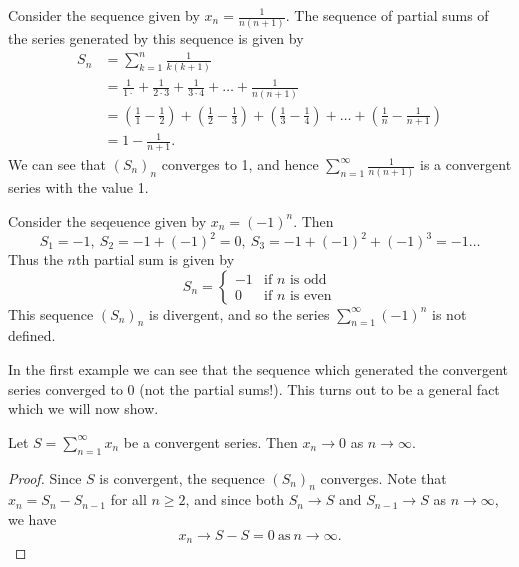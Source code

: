 \documentclass[../real_analysis.tex]{subfiles}
\begin{document}
        \begin{example}
            Consider the sequence given by $x_n=\frac{1}{n(n+1)}$. The sequence of partial sums of the series generated by this sequence is given by
            \begin{align*}
                S_n&=\sum_{k=1}^n\frac{1}{k(k+1)}\\
                &=\frac{1}{1\cdot}+\frac{1}{2\cdot3}+\frac{1}{3\cdot4}+\dots+\frac{1}{n(n+1)}\\
                &=\left(\frac{1}{1}-\frac{1}{2}\right)+\left(\frac{1}{2}-\frac{1}{3}\right)+\left(\frac{1}{3}-\frac{1}{4}\right)+\dots+\left(\frac{1}{n}-\frac{1}{n+1}\right)\\
                &=1-\frac{1}{n+1}.
            \end{align*}
            We can see that $(S_n)_n$ converges to 1, and hence $\sum_{n=1}^\infty\frac{1}{n(n+1)}$ is a convergent series with the value 1.
        \end{example}
        \begin{example}
            Consider the seqeuence given by $x_n=(-1)^n$. Then
            \begin{equation*}
                S_1=-1,\ S_2=-1+(-1)^2=0,\ S_3=-1+(-1)^2+(-1)^3=-1\dots
            \end{equation*}
            Thus the $n$th partial sum is given by
            \begin{equation*}
                S_n=\begin{cases}
                    -1 & \text{if $n$ is odd}\\
                    0 & \text{if $n$ is even}
                \end{cases}
            \end{equation*}
            This sequence $(S_n)_n$ is divergent, and so the series $\sum_{n=1}^\infty(-1)^n$ is not defined.
        \end{example}
        In the first example we can see that the sequence which generated the convergent series converged to 0 (not the partial sums!). This turns out to be a general fact which we will now show.
        \begin{theorem}\label{seq-of-series-to-0}
            Let $S=\sum_{n=1}^\infty x_n$ be a convergent series. Then $x_n\to0$ as $n\to\infty$.
        \end{theorem}
        \begin{proof}
            Since $S$ is convergent, the sequence $(S_n)_n$ converges. Note that $x_n=S_n-S_{n-1}$ for all $n\geq2$, and since both $S_n\to S$ and $S_{n-1}\to S$ as $n\to\infty$, we have
            \begin{equation*}
                x_n\to S-S=0\ \text{as}\ n\to\infty.
            \end{equation*}
        \end{proof}
\end{document}
